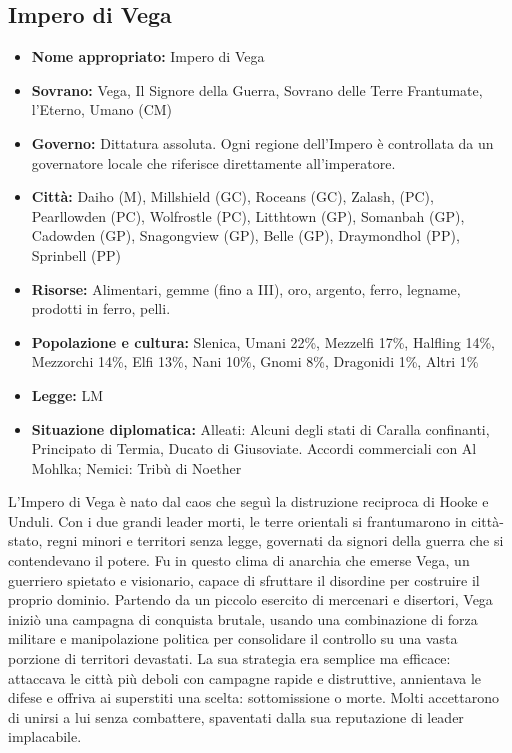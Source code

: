 \documentclass[a4paper]{report}
\begin{document}
\begin{multicols}{2}
\subsection*{Impero di Vega}
\begin{itemize}
	\item \textbf{Nome appropriato:} Impero di Vega
	\item \textbf{Sovrano:} Vega, Il Signore della Guerra, Sovrano delle Terre Frantumate, l'Eterno, Umano (CM)
	\item \textbf{Governo:} Dittatura assoluta. Ogni regione dell’Impero è controllata da un governatore locale che riferisce direttamente all'imperatore.
	\item \textbf{Città:} Daiho (M), Millshield (GC), Roceans (GC), Zalash, (PC), Pearllowden (PC), Wolfrostle (PC), Litthtown (GP), Somanbah (GP), Cadowden (GP), Snagongview (GP), Belle (GP), Draymondhol (PP), Sprinbell (PP)
	\item \textbf{Risorse:} Alimentari, gemme (fino a III), oro, argento, ferro, legname, prodotti in ferro, pelli.
	\item \textbf{Popolazione e cultura:} Slenica, Umani 22\%, Mezzelfi 17\%, Halfling 14\%, Mezzorchi 14\%, Elfi 13\%, Nani 10\%, Gnomi 8\%, Dragonidi 1\%, Altri 1\%
	\item \textbf{Legge:} LM
	\item \textbf{Situazione diplomatica:} Alleati: Alcuni degli stati di Caralla confinanti, Principato di Termia, Ducato di Giusoviate. Accordi commerciali con Al Mohlka; Nemici: Tribù di Noether	
\end{itemize}
L’Impero di Vega è nato dal caos che seguì la distruzione reciproca di Hooke e Unduli. Con i due grandi leader morti, le terre orientali si frantumarono in città-stato, regni minori e territori senza legge, governati da signori della guerra che si contendevano il potere. Fu in questo clima di anarchia che emerse Vega, un guerriero spietato e visionario, capace di sfruttare il disordine per costruire il proprio dominio. Partendo da un piccolo esercito di mercenari e disertori, Vega iniziò una campagna di conquista brutale, usando una combinazione di forza militare e manipolazione politica per consolidare il controllo su una vasta porzione di territori devastati. La sua strategia era semplice ma efficace: attaccava le città più deboli con campagne rapide e distruttive, annientava le difese e offriva ai superstiti una scelta: sottomissione o morte. Molti accettarono di unirsi a lui senza combattere, spaventati dalla sua reputazione di leader implacabile.

\end{multicols}
\end{document}
